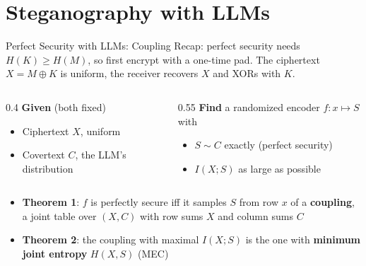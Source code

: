 
\section{Steganography with LLMs}

\begin{frame}{Perfect Security with LLMs: Coupling}
Recap: perfect security needs $H(K) \geq H(M)$, so first encrypt with a one-time pad.
The ciphertext $X = M \oplus K$ is uniform, the receiver recovers $X$ and XORs with $K$.
\vspace{0.5em}
\begin{columns}[T]
\begin{column}{0.4\textwidth}
\textbf{Given} (both fixed)
\begin{itemize}
\item Ciphertext $X$, uniform
\item Covertext $C$, the LLM's distribution
\end{itemize}
\end{column}
\begin{column}{0.55\textwidth}
\textbf{Find} a randomized encoder $f: x \mapsto S$ with
\begin{itemize}
\item $S \sim C$ exactly (perfect security)
\item $I(X; S)$ as large as possible
\end{itemize}
\end{column}
\end{columns}
\vspace{0.5em}
\begin{itemize}
\item \textbf{Theorem 1}: $f$ is perfectly secure iff it samples $S$ from row $x$ of a \textbf{coupling}, a joint table over $(X, C)$ with row sums $X$ and column sums $C$
\item \textbf{Theorem 2}: the coupling with maximal $I(X; S)$ is the one with \textbf{minimum joint entropy} $H(X, S)$ (MEC)
\end{itemize}



\end{frame}
